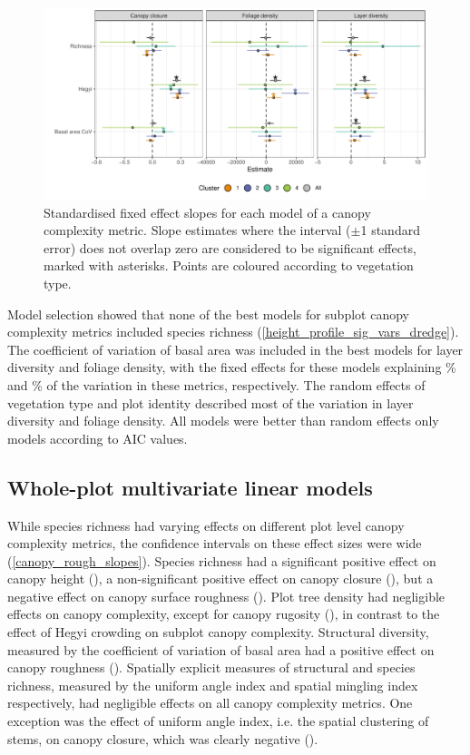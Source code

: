 \documentclass[11pt,a4paper]{article}
\begin{document}
\begin{figure}
	\includegraphics[width=\linewidth]{height_profile_mod_rich_slopes_sites}
	\caption{Standardised fixed effect slopes for each model of a canopy complexity metric. Slope estimates where the interval ($\pm$1 standard error) does not overlap zero are considered to be significant effects, marked with asterisks. Points are coloured according to vegetation type.}
	\label{height_profile_mod_rich_slopes_sites}
\end{figure}

Model selection showed that none of the best models for subplot canopy complexity metrics included species richness (\autoref{height_profile_sig_vars_dredge}). The coefficient of variation of basal area was included in the best models for layer diversity and foliage density, with the fixed effects for these models explaining \bestLayerDivRsqS\% and \bestDensRsqS\% of the variation in these metrics, respectively. The random effects of vegetation type and plot identity described most of the variation in layer diversity and foliage density. All models were better than random effects only models according to AIC values.



\subsection{Whole-plot multivariate linear models}

While species richness had varying effects on different plot level canopy complexity metrics, the confidence intervals on these effect sizes were wide (\autoref{canopy_rough_slopes}). Species richness had a significant positive effect on canopy height (\richHeightP{}), a non-significant positive effect on canopy closure (\richCoverP{}), but a negative effect on canopy surface roughness (\richRoughP{}). Plot tree density had negligible effects on canopy complexity, except for canopy rugosity (\treeDensRugP{}), in contrast to the effect of Hegyi crowding on subplot canopy complexity. Structural diversity, measured by the coefficient of variation of basal area had a positive effect on canopy roughness (\covBARoughP{}). Spatially explicit measures of structural and species richness, measured by the uniform angle index and spatial mingling index respectively, had negligible effects on all canopy complexity metrics. One exception was the effect of uniform angle index, i.e. the spatial clustering of stems, on canopy closure, which was clearly negative (\wiCoverP{}). 
\end{document}
